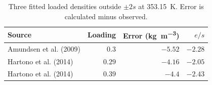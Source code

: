 \begin{table}[!htbp]\small\setlength{\tabcolsep}{3pt}\centering
\caption{Three fitted loaded densities outside $\pm2s$ at \SI{353.15}{\kelvin}. Error is calculated minus observed.}\label{tab:density-failures}
\begin{tabular}{@{}lrrr@{}}
\toprule
Source & Loading & Error (\si{\kilogram\per\cubic\metre}) & $e/s$ \\
\midrule
Amundsen et al. (2009) & $0.3$ & $-5.52$ & $-2.28$ \\
Hartono et al. (2014) & $0.29$ & $-4.16$ & $-2.05$ \\
Hartono et al. (2014) & $0.39$ & $-4.4$ & $-2.43$ \\
\bottomrule
\end{tabular}
\end{table}
